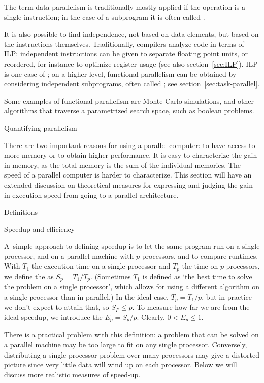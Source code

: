 The term data parallelism is traditionally mostly applied
if the operation is a single instruction; in the case of a subprogram
it is often called .

It is also possible to find independence, not based on data elements,
but based on the instructions themselves. Traditionally, compilers
analyze code in terms of \ac{ILP}: independent instructions can be given
to separate floating point units, or reordered, for instance to optimize
register usage (see also section~\ref{sec:ILP}).
\ac{ILP} is one case of ;
on a higher level, functional parallelism can be obtained
by considering independent subprograms, often called ;
see section~\ref{sec:task-parallel}.

Some examples of functional parallelism are Monte Carlo simulations,
and other algorithms that traverse a parametrized search space,
such as boolean  problems.

 {Quantifying parallelism}
\label{sec:speedup-efficiency}

There are two important reasons for using a parallel computer: to have
access to more memory or to obtain higher performance. It is easy to
characterize the gain in memory, as the total memory is the sum of the
individual memories. The speed of a parallel computer is harder to
characterize. This section will have an extended discussion on
theoretical measures for expressing and judging the gain in execution
speed from going to a parallel architecture.

 {Definitions}
\label{sec:speedup}

 {Speedup and efficiency}

A~simple approach to defining speedup is to let the same program run on a
single processor, and on a parallel machine with $p$ processors, and
to compare runtimes.
With $T_1$ the execution time on a single processor and
$T_p$ the time on $p$ processors, we define the  as
$S_p=T_1/T_p$. (Sometimes $T_1$ is defined as `the best time to solve the
problem on a single processor', which allows for using a different
algorithm on a single processor than in parallel.)
In the ideal case, $T_p=T_1/p$, but in practice we don't expect to
attain that, so $S_P\leq p$. To measure how far we are from the ideal
speedup, we introduce the  $E_p=S_p/p$. Clearly,
$0< E_p\leq 1$.

There is a practical problem with
this definition: a problem that can be solved on a parallel machine
may be too large to fit on any single processor. Conversely,
distributing a single processor problem
over many processors may give a distorted picture since very little
data will wind up on each processor. Below we will discuss more
realistic measures of speed-up.

